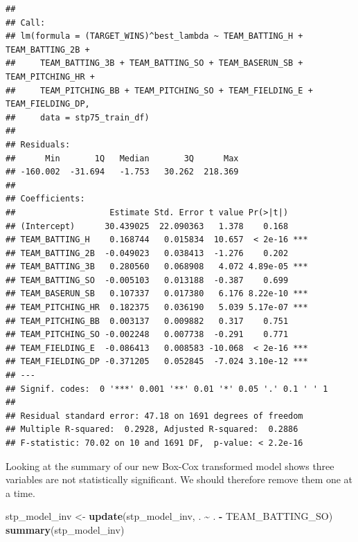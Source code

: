 \documentclass[
]{article}
\newenvironment{Shaded}{\begin{snugshade}}{\end{snugshade}}
\newcommand{\FunctionTok}[1]{\textcolor[rgb]{0.13,0.29,0.53}{\textbf{#1}}}
\newcommand{\NormalTok}[1]{#1}
\newcommand{\OtherTok}[1]{\textcolor[rgb]{0.56,0.35,0.01}{#1}}
\newcommand{\SpecialCharTok}[1]{\textcolor[rgb]{0.81,0.36,0.00}{\textbf{#1}}}
\begin{document}
\begin{verbatim}
## 
## Call:
## lm(formula = (TARGET_WINS)^best_lambda ~ TEAM_BATTING_H + TEAM_BATTING_2B + 
##     TEAM_BATTING_3B + TEAM_BATTING_SO + TEAM_BASERUN_SB + TEAM_PITCHING_HR + 
##     TEAM_PITCHING_BB + TEAM_PITCHING_SO + TEAM_FIELDING_E + TEAM_FIELDING_DP, 
##     data = stp75_train_df)
## 
## Residuals:
##      Min       1Q   Median       3Q      Max 
## -160.002  -31.694   -1.753   30.262  218.369 
## 
## Coefficients:
##                   Estimate Std. Error t value Pr(>|t|)    
## (Intercept)      30.439025  22.090363   1.378    0.168    
## TEAM_BATTING_H    0.168744   0.015834  10.657  < 2e-16 ***
## TEAM_BATTING_2B  -0.049023   0.038413  -1.276    0.202    
## TEAM_BATTING_3B   0.280560   0.068908   4.072 4.89e-05 ***
## TEAM_BATTING_SO  -0.005103   0.013188  -0.387    0.699    
## TEAM_BASERUN_SB   0.107337   0.017380   6.176 8.22e-10 ***
## TEAM_PITCHING_HR  0.182375   0.036190   5.039 5.17e-07 ***
## TEAM_PITCHING_BB  0.003137   0.009882   0.317    0.751    
## TEAM_PITCHING_SO -0.002248   0.007738  -0.291    0.771    
## TEAM_FIELDING_E  -0.086413   0.008583 -10.068  < 2e-16 ***
## TEAM_FIELDING_DP -0.371205   0.052845  -7.024 3.10e-12 ***
## ---
## Signif. codes:  0 '***' 0.001 '**' 0.01 '*' 0.05 '.' 0.1 ' ' 1
## 
## Residual standard error: 47.18 on 1691 degrees of freedom
## Multiple R-squared:  0.2928, Adjusted R-squared:  0.2886 
## F-statistic: 70.02 on 10 and 1691 DF,  p-value: < 2.2e-16
\end{verbatim}

Looking at the summary of our new Box-Cox transformed model shows three
variables are not statistically significant. We should therefore remove
them one at a time.

\begin{Shaded}
\begin{Highlighting}[]
\NormalTok{stp\_model\_inv }\OtherTok{\textless{}{-}} \FunctionTok{update}\NormalTok{(stp\_model\_inv, . }\SpecialCharTok{\textasciitilde{}}\NormalTok{ . }\SpecialCharTok{{-}}\NormalTok{ TEAM\_BATTING\_SO)}
\FunctionTok{summary}\NormalTok{(stp\_model\_inv)}
\end{Highlighting}
\end{Shaded}
\end{document}
